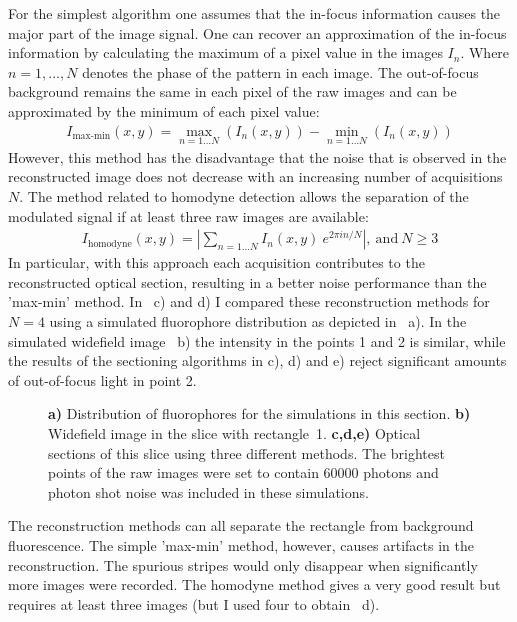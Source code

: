 For the simplest algorithm \citep{Benedetti1997} one assumes that the
in-focus information causes the major part of the image signal.  One
can recover an approximation of the in-focus information by
calculating the maximum of a pixel value in the images $I_n$. Where
$n=1,\ldots,N$ denotes the phase of the pattern in each image.  The
out-of-focus background remains the same in each pixel of the raw
images and can be approximated by the minimum of each pixel value:
\begin{align} \label{eq:Iminmax}
  I_\textrm{max-min}(x,y) = \max_{n=1\ldots N}(I_n(x,y))- \min_{n=1\ldots N}(I_n(x,y))
\end{align}
However, this method has the disadvantage that the noise that is
observed in the reconstructed image does not decrease with an
increasing number of acquisitions $N$.  The method related to homodyne
detection \citep{Neil1997} allows the separation of the modulated
signal if at least three raw images are available:
\begin{align} \label{eq:Ihomodyne}
  I_\textrm{homodyne}(x,y) = \left| \sum_{n=1\ldots N} I_n(x,y)\ e^{2\pi i n/N}\right|,\ \textrm{and}\ N\ge 3
\end{align}
In particular, with this approach each acquisition contributes to the
reconstructed optical section, resulting in a better noise performance
than the 'max-min' method.  In ~c) and
d) I compared these reconstruction methods for $N=4$ using a simulated
fluorophore distribution as depicted in
~a).  In the simulated widefield image
~b) the intensity in the points 1 and
2 is similar, while the results of the sectioning algorithms in c), d)
and e) reject significant amounts of out-of-focus light in point 2.
\begin{figure}[htbp]
  \centering
  \caption{{\bf a)} Distribution of fluorophores for the simulations
    in this section. {\bf b)} Widefield image in the slice with
    rectangle~1. {\bf c,d,e)} Optical sections of this slice using
    three different methods.  The brightest points of the raw images
    were set to contain 60000 photons and photon shot noise was
    included in these simulations.}
  \label{fig:hilo-sec-comparison}
\end{figure}

The reconstruction methods can all separate the rectangle from
background fluorescence. The simple 'max-min' method, however, causes
artifacts in the reconstruction. The spurious stripes would only
disappear when significantly more images were recorded. The homodyne
method gives a very good result but requires at least three images
(but I used four to obtain ~d).

